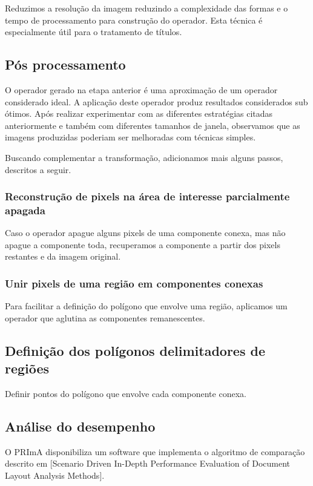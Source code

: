 \documentclass[a4paper,11pt]{article}
\begin{document}
        Reduzimos a resolução da imagem reduzindo a complexidade das formas e o tempo de processamento para construção do operador. Esta técnica é especialmente útil para o tratamento de títulos.

    \subsection{Pós processamento}

      O operador gerado na etapa anterior é uma aproximação de um operador considerado ideal. A aplicação deste operador produz resultados considerados sub ótimos. Após realizar experimentar com as diferentes estratégias citadas anteriormente e também com diferentes tamanhos de janela, observamos que as imagens produzidas poderiam ser melhoradas com técnicas simples.

      Buscando complementar a transformação, adicionamos mais alguns passos, descritos a seguir.

      \subsubsection{Reconstrução de pixels na área de interesse parcialmente apagada}

        Caso o operador apague alguns pixels de uma componente conexa, mas não apague a componente toda, recuperamos a componente a partir dos pixels restantes e da imagem original.

      \subsubsection{Unir pixels de uma região em componentes conexas}

        Para facilitar a definição do polígono que envolve uma região, aplicamos um operador que aglutina as componentes remanescentes.

    \subsection{Definição dos polígonos delimitadores de regiões}

      Definir pontos do polígono que envolve cada componente conexa.

    \subsection{Análise do desempenho}

      O PRImA disponibiliza um software que implementa o algoritmo de comparação descrito em [Scenario Driven In-Depth Performance Evaluation of Document Layout Analysis Methods].
\end{document}
